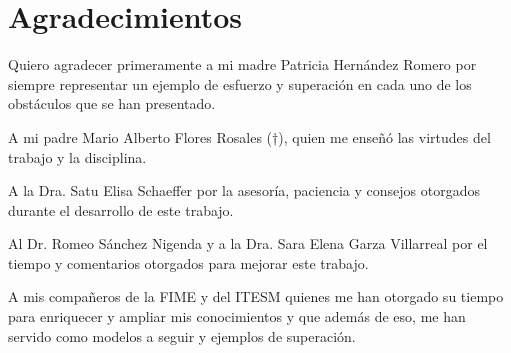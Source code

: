 
\chapter{Agradecimientos}

Quiero agradecer primeramente a mi madre Patricia Hernández Romero por siempre representar un ejemplo de esfuerzo y superación en cada uno de los obstáculos que se han presentado.

A mi padre Mario Alberto Flores Rosales (†), quien me enseñó las virtudes del trabajo y la disciplina.

A la Dra. Satu Elisa Schaeffer por la asesoría, paciencia y consejos otorgados durante el desarrollo de este trabajo.

Al Dr. Romeo Sánchez Nigenda y a la Dra. Sara Elena Garza Villarreal por el tiempo y comentarios otorgados para mejorar este trabajo.


A mis compañeros de la FIME y del ITESM quienes me han otorgado su tiempo para enriquecer y ampliar mis conocimientos y que además de eso, me han servido como modelos a seguir y ejemplos de superación.
